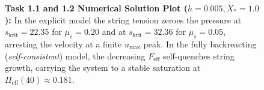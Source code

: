 \documentclass[12pt,a4paper]{article}
\begin{document}
\begin{figure}[htbp]
\caption{\textbf{Task 1.1 and 1.2 Numerical Solution Plot ($h=0.005, X_*=1.0$):} In the explicit model the string tension zeroes the pressure at $s_{\mathrm{krit}}=22.35$ for $\mu_s=0.20$ and at $s_{\mathrm{krit}}=32.36$ for $\mu_s=0.05$, arresting the velocity at a finite $u_{\max}$ peak. In the fully backreacting (\textit{self-consistent}) model, the decreasing $F_{\mathrm{eff}}$ self-quenches string growth, carrying the system to a stable saturation at $\Pi_{\mathrm{eff}}(40) \approx 0.181$.}
\end{figure}
\end{document}

